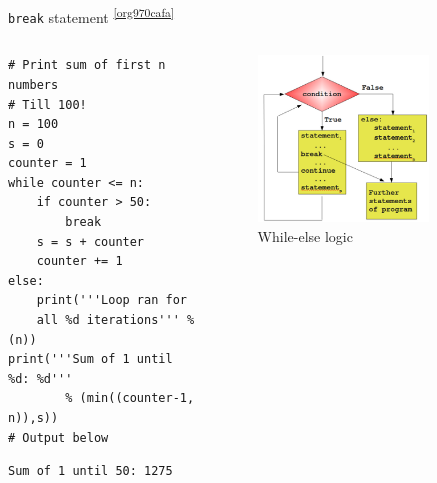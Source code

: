 \documentclass[presentation]{beamer}
\begin{document}
\begin{frame}[label={sec:orgd2e257f},fragile]{\texttt{break} statement \textsuperscript{\cref{org970cafa}}}
 \begin{columns}
\begin{column}{0.48\columnwidth}
\scriptsize
\begin{verbatim}
# Print sum of first n numbers
# Till 100!
n = 100
s = 0
counter = 1
while counter <= n:
    if counter > 50:
        break
    s = s + counter
    counter += 1
else:
    print('''Loop ran for
    all %d iterations''' % (n))
print('''Sum of 1 until %d: %d'''
        % (min((counter-1, n)),s))
# Output below
\end{verbatim}

\begin{verbatim}
Sum of 1 until 50: 1275
\end{verbatim}
\end{column}


\begin{column}{0.45\columnwidth}
\footnotesize
\begin{figure}[htbp]
\centering
\includegraphics[width=0.8\textwidth]{images/while_loop_with_else_break.png}
\caption{While-else logic}
\end{figure}
\end{column}
\end{columns}
\end{frame}
\end{document}
